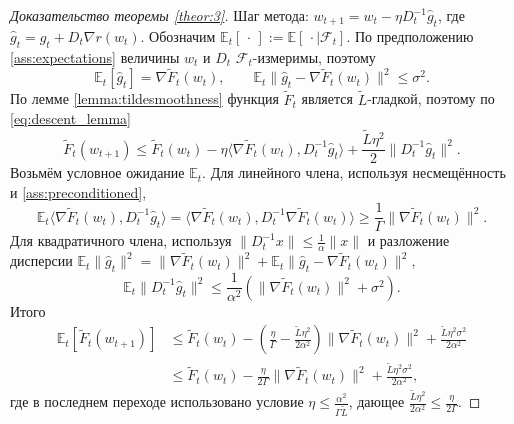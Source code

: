 \begin{proof}[Доказательство теоремы \ref{theor:3}]
Шаг метода: $w_{t+1} = w_t - \eta D_t^{-1}\widehat{g}_t$, где $\widehat{g}_t = g_t + D_t \nabla r(w_t)$. Обозначим $\mathbb{E}_t[\,\cdot\,] := \mathbb{E}[\,\cdot \mid \mathcal{F}_t]$. По предположению \ref{ass:expectations} величины $w_t$ и $D_t$ $\mathcal{F}_t$-измеримы, поэтому
$$\mathbb{E}_t[\widehat{g}_t] = \nabla \widetilde{F}_t(w_t), \qquad \mathbb{E}_t\|\widehat{g}_t - \nabla \widetilde{F}_t(w_t)\|^2 \le \sigma^2.$$
По лемме \ref{lemma:tildesmoothness} функция $\widetilde{F}_t$ является $\widetilde{L}$-гладкой, поэтому по \eqref{eq:descent_lemma}
\begin{equation*}
    \widetilde{F}_t(w_{t+1}) \le \widetilde{F}_t(w_t) - \eta \langle \nabla \widetilde{F}_t(w_t), D_t^{-1}\widehat{g}_t \rangle + \frac{\widetilde{L}\eta^2}{2}\|D_t^{-1}\widehat{g}_t\|^2.
\end{equation*}
Возьмём условное ожидание $\mathbb{E}_t$. Для линейного члена, используя несмещённость и \ref{ass:preconditioned},
\begin{equation*}
    \mathbb{E}_t \langle \nabla \widetilde{F}_t(w_t), D_t^{-1}\widehat{g}_t \rangle = \langle \nabla \widetilde{F}_t(w_t), D_t^{-1}\nabla \widetilde{F}_t(w_t) \rangle \ge \frac{1}{\Gamma}\|\nabla \widetilde{F}_t(w_t)\|^2.
\end{equation*}
Для квадратичного члена, используя $\|D_t^{-1}x\| \le \frac{1}{\alpha}\|x\|$ и разложение дисперсии $\mathbb{E}_t\|\widehat{g}_t\|^2 = \|\nabla \widetilde{F}_t(w_t)\|^2 + \mathbb{E}_t\|\widehat{g}_t - \nabla \widetilde{F}_t(w_t)\|^2$,
\begin{equation*}
    \mathbb{E}_t\|D_t^{-1}\widehat{g}_t\|^2 \le \frac{1}{\alpha^2}\left(\|\nabla \widetilde{F}_t(w_t)\|^2 + \sigma^2\right).
\end{equation*}
Итого
\begin{equation*}
\begin{split}
    \mathbb{E}_t\left[\widetilde{F}_t(w_{t+1})\right] &\le \widetilde{F}_t(w_t) - \left(\frac{\eta}{\Gamma} - \frac{\widetilde{L}\eta^2}{2\alpha^2}\right) \|\nabla \widetilde{F}_t(w_t)\|^2 + \frac{\widetilde{L}\eta^2\sigma^2}{2\alpha^2} \\
    &\le \widetilde{F}_t(w_t) - \frac{\eta}{2\Gamma} \|\nabla \widetilde{F}_t(w_t)\|^2 + \frac{\widetilde{L}\eta^2\sigma^2}{2\alpha^2},
\end{split}
\end{equation*}
где в последнем переходе использовано условие $\eta \le \frac{\alpha^2}{\Gamma\widetilde{L}}$, дающее $\frac{\widetilde{L}\eta^2}{2\alpha^2} \le \frac{\eta}{2\Gamma}$.

\end{proof}
